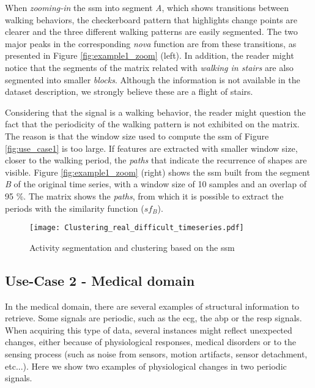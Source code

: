 {When \textit{zooming-in} the \gls{ssm} into segment \textit{A}, which shows transitions between walking behaviors, the checkerboard pattern that highlights change points are clearer and the three different walking patterns are easily segmented. The two major peaks in the corresponding \textit{nova} function are from these transitions, as presented in Figure \ref{fig:example1_zoom} (left). In addition, the reader might notice that the segments of the matrix related with \textit{walking in stairs} are also segmented into smaller \textit{blocks}. Although the information is not available in the dataset description, we strongly believe these are a flight of stairs.
\par
Considering that the signal is a walking behavior, the reader might question the fact that the periodicity of the walking pattern is not exhibited on the matrix. The reason is that the window size used to compute the \gls{ssm} of Figure \ref{fig:use_case1} is too large. If features are extracted with smaller window size, closer to the walking period, the \textit{paths} that indicate the recurrence of shapes are visible. Figure \ref{fig:example1_zoom} (right) shows the \gls{ssm} built from the segment \textit{B} of the original time series, with a window size of 10 samples and an overlap of 95 \%. The matrix shows the \textit{paths}, from which it is possible to extract the periods with the similarity function ($sf_B$).

\begin{figure}
    \centering
    \texttt{[image: Clustering\_real\_difficult\_timeseries.pdf]}
    \caption{Activity segmentation and clustering based on the \gls{ssm}}
    \label{fig:example2_har}
\end{figure}


\subsection{Use-Case 2 - Medical domain}

In the medical domain, there are several examples of structural information to retrieve. Some signals are periodic, such as the \gls{ecg}, the \gls{abp} or the \gls{resp} signals. When acquiring this type of data, several instances might reflect unexpected changes, either because of physiological responses, medical disorders or to the sensing process (such as noise from sensors, motion artifacts, sensor detachment, etc...). Here we show two examples of physiological changes in two periodic signals.

}
